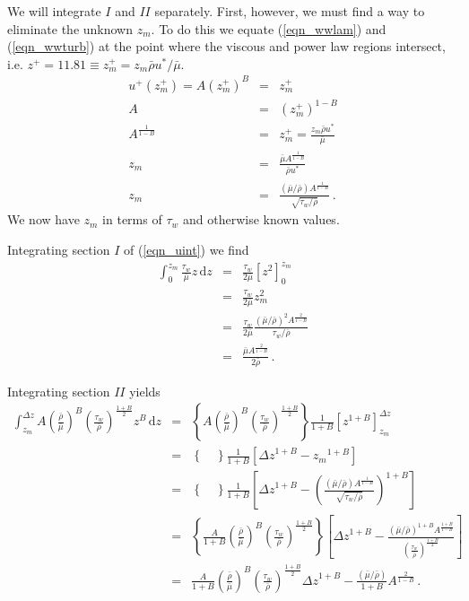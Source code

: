 \documentclass[11pt]{book}
\begin{document}
We will integrate $I$ and $II$ separately.  First, however, we must find a way to eliminate the unknown $z_m$.  To do this we equate (\ref{eqn_wwlam}) and (\ref{eqn_wwturb}) at the point where the viscous and power law regions intersect, i.e. $z^+ = 11.81 \equiv z_m^+ = z_m \bar{\rho}u^*/\bar{\mu}$.
\begin{eqnarray}
\label{eqn_derivezm}
u^+(z_m^+) = A(z_m^+)^B &=& z_m^+ \nonumber\\
A &=& (z_m^+)^{1-B} \nonumber\\
A^{\frac{1}{1-B}} &=& z_m^+ = \frac{z_m\bar{\rho}u^*}{\bar{\mu}} \nonumber\\
z_m &=& \frac{\bar{\mu}A^{\frac{1}{1-B}}}{\bar{\rho}u^*} \nonumber\\
z_m &=& \frac{(\bar{\mu}/\bar{\rho})A^{\frac{1}{1-B}}}{\sqrt{\tau_w/\bar{\rho}}} \,\mbox{.}
\end{eqnarray}
We now have $z_m$ in terms of $\tau_w$ and otherwise known values.

Integrating section $I$ of (\ref{eqn_uint}) we find
\begin{eqnarray}
\label{eqn_intI}
\int_0^{z_m} \frac{\tau_w}{\bar{\mu}} z\,\mbox{d}z &=& \frac{\tau_w}{2\bar{\mu}} \left[ z^2 \right]_0^{z_m} \nonumber\\
&=& \frac{\tau_w}{2\bar{\mu}} z_m^2 \nonumber\\
&=& \frac{\tau_w}{2\bar{\mu}} \frac{(\bar{\mu}/\bar{\rho})^2A^{\frac{2}{1-B}}}{\tau_w/\bar{\rho}} \nonumber\\
&=& \frac{\bar{\mu} A^{\frac{2}{1-B}}}{2\bar{\rho}} \,\mbox{.}
\end{eqnarray}

Integrating section $II$ yields
\begin{eqnarray}
\label{eqn_intII}
\int_{z_m}^{\Delta z} A\left(\frac{\bar{\rho}}{\bar{\mu}}\right)^B \left(\frac{\tau_w}{\bar{\rho}}\right)^{\frac{1+B}{2}} z^B\,\mbox{d}z &=& \left\{A\left(\frac{\bar{\rho}}{\bar{\mu}}\right)^B \left(\frac{\tau_w}{\bar{\rho}}\right)^{\frac{1+B}{2}}\right\} \frac{1}{1+B} \left[z^{1+B}\right]_{z_m}^{\Delta z} \nonumber\\
&=& \left\{ \quad \right\} \frac{1}{1+B} \left[{\Delta z}^{1+B} - {z_m}^{1+B}\right] \nonumber\\
&=& \left\{ \quad \right\} \frac{1}{1+B} \left[{\Delta z}^{1+B} - \left(\frac{(\bar{\mu}/\bar{\rho})A^{\frac{1}{1-B}}}{\sqrt{\tau_w/\bar{\rho}}}\right)^{1+B}\right] \nonumber\\
&=& \left\{ \frac{A}{1+B} \left(\frac{\bar{\rho}}{\bar{\mu}}\right)^B \left(\frac{\tau_w}{\bar{\rho}}\right)^{\frac{1+B}{2}} \right\} \left[{\Delta z}^{1+B} - \frac{(\bar{\mu}/\bar{\rho})^{1+B} A^{\frac{1+B}{1-B}}}{\left(\frac{\tau_w}{\bar{\rho}}\right)^{\frac{1+B}{2}}}\right] \nonumber\\
&=& \frac{A}{1+B} \left(\frac{\bar{\rho}}{\bar{\mu}}\right)^B \left(\frac{\tau_w}{\bar{\rho}}\right)^{\frac{1+B}{2}} {\Delta z}^{1+B} - \frac{(\bar{\mu}/\bar{\rho})}{1+B} A^{\frac{2}{1-B}} \,\mbox{.}
\end{eqnarray}
\end{document}
